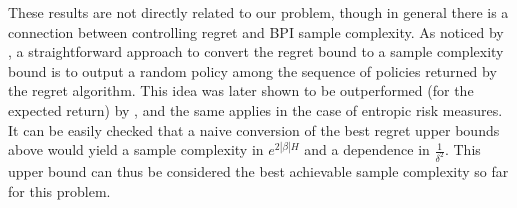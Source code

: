 \documentclass[final,12pt]{colt2026} %
\begin{document}


These results are not directly related to our problem, though in general there is a connection between controlling regret and BPI sample complexity. As noticed by \citet{Jin2020RewardFree}, a straightforward approach to convert the regret bound to a sample complexity bound is to output a random policy among the sequence of policies returned by the regret algorithm. This idea was later shown to be outperformed (for the expected return) by \citet{Kaufmann2021ALT}, and the same applies in the case of entropic risk measures. It can be easily checked that a naive conversion of the best regret upper bounds above would yield a sample complexity in $e^{2|\beta| H}$ and a dependence in $\frac{1}{\delta^2}$. This upper bound can thus be considered the best achievable sample complexity so far for this problem. 

\end{document}

